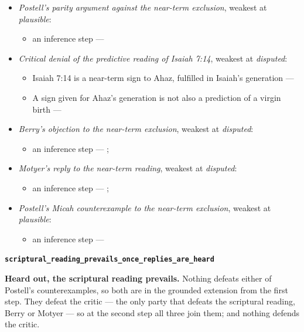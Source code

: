 \documentclass[11pt]{article}
\begin{document}
\begin{itemize}
\begin{itemize}
\item an inference step --- \cite[ad loc. Isa 7:14]{motyer-isaiah-1993}
\item an inference step --- \cite[9--10]{miravalle-meet-mary-2007}
\item an inference step --- \cite[490--493]{postell-isaiah-messianic-2025}
\item an inference step --- \cite[ad loc. Matt 1:23]{france-matthew-2007}
\end{itemize}
\item \emph{Postell's parity argument against the near-term exclusion}, weakest at \emph{plausible}:
\begin{itemize}
\item an inference step --- \cite[487--489]{postell-isaiah-messianic-2025}
\end{itemize}
\item \emph{Critical denial of the predictive reading of Isaiah 7:14}, weakest at \emph{disputed}:
\begin{itemize}
\item Isaiah 7:14 is a near-term sign to Ahaz, fulfilled in Isaiah's generation --- \cite{brown-birth-messiah-1993}
\item A sign given for Ahaz's generation is not also a prediction of a virgin birth --- \cite{brown-birth-messiah-1993}
\end{itemize}
\item \emph{Berry's objection to the near-term exclusion}, weakest at \emph{disputed}:
\begin{itemize}
\item an inference step --- \cite[1653--1654]{berry-virgin-birth-2003}; \cite[5]{compton-immanuel-prophecy-2007}
\end{itemize}
\item \emph{Motyer's reply to the near-term reading}, weakest at \emph{disputed}:
\begin{itemize}
\item an inference step --- \cite[124]{motyer-context-content-1970}; \cite[5]{compton-immanuel-prophecy-2007}
\end{itemize}
\item \emph{Postell's Micah counterexample to the near-term exclusion}, weakest at \emph{plausible}:
\begin{itemize}
\item an inference step --- \cite[481]{postell-isaiah-messianic-2025}
\end{itemize}
\end{itemize}
\par\medskip\noindent\textbf{\texttt{scriptural\_\allowbreak{}reading\_\allowbreak{}prevails\_\allowbreak{}once\_\allowbreak{}replies\_\allowbreak{}are\_\allowbreak{}heard}}\par\nobreak\noindent
\textbf{Heard out, the scriptural reading prevails.} Nothing defeats either of Postell's counterexamples, so both are in the grounded extension from the first step. They defeat the critic — the only party that defeats the scriptural reading, Berry or Motyer — so at the second step all three join them; and nothing defends the critic.
\end{document}
